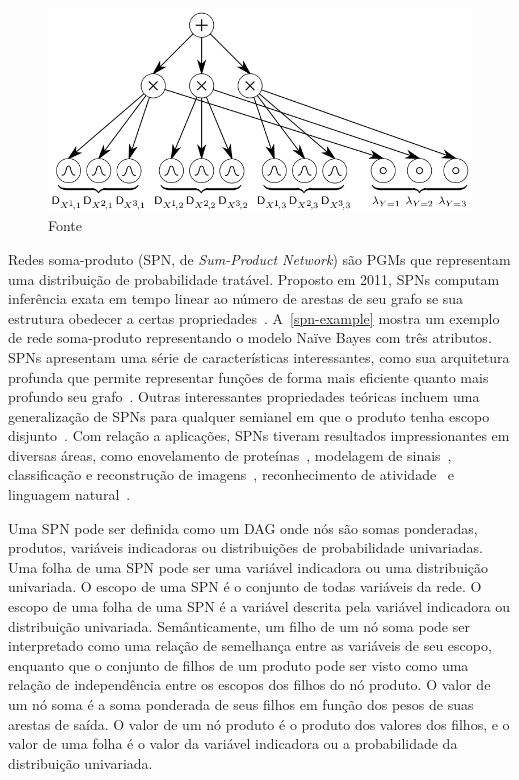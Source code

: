\documentclass[12pt]{article}
\theoremstyle{plain}
\numberwithin{equation}{section}
\begin{document}
\begin{figure}[h]
  \centering
  \includegraphics[scale=0.4]{nbayes.png}
  \caption{Fonte~\cite{peharz-spn}}\label{spn-example}
\end{figure}

Redes soma-produto (SPN, de \textit{Sum-Product Network}) são PGMs que representam uma distribuição
de probabilidade tratável. Proposto em 2011, SPNs computam inferência exata em tempo linear ao
número de arestas de seu grafo se sua estrutura obedecer a certas
propriedades~\cite{poon-domingos}. A~\autoref{spn-example} mostra um exemplo de rede soma-produto
representando o modelo Naïve Bayes com três atributos. SPNs apresentam uma série de características
interessantes, como sua arquitetura profunda que permite representar funções de forma mais
eficiente quanto mais profundo seu grafo~\cite{shallow-vs-deep}. Outras interessantes propriedades
teóricas incluem uma generalização de SPNs para qualquer semianel em que o produto tenha escopo
disjunto~\cite{sp-theorem}. Com relação a aplicações, SPNs tiveram resultados impressionantes em
diversas áreas, como enovelamento de proteínas~\cite{rec-dec-non-convex}, modelagem de
sinais~\cite{model-speech}, classificação e reconstrução de
imagens~\cite{gens-domingos,poon-domingos,clustering}, reconhecimento de atividade~\cite{activity}
e linguagem natural~\cite{nat-lang}.

Uma SPN pode ser definida como um DAG onde nós são somas ponderadas, produtos, variáveis
indicadoras ou distribuições de probabilidade univariadas. Uma folha de uma SPN pode ser uma
variável indicadora ou uma distribuição univariada. O escopo de uma SPN é o conjunto de todas
variáveis da rede. O escopo de uma folha de uma SPN é a variável descrita pela variável indicadora
ou distribuição univariada. Semânticamente, um filho de um nó soma pode ser interpretado como uma
relação de semelhança entre as variáveis de seu escopo, enquanto que o conjunto de filhos de um
produto pode ser visto como uma relação de independência entre os escopos dos filhos do nó produto.
O valor de um nó soma é a soma ponderada de seus filhos em função dos pesos de suas arestas de
saída. O valor de um nó produto é o produto dos valores dos filhos, e o valor de uma folha é o valor
da variável indicadora ou a probabilidade da distribuição univariada.
\end{document}
